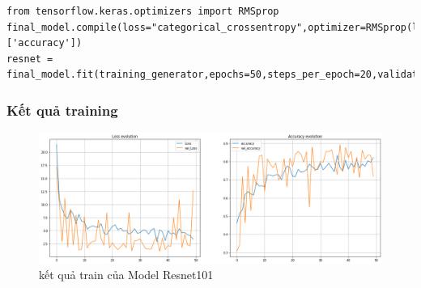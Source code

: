 \begin{lstlisting}
from tensorflow.keras.optimizers import RMSprop
final_model.compile(loss="categorical_crossentropy",optimizer=RMSprop(lr=0.001),metrics=['accuracy'])
resnet = final_model.fit(training_generator,epochs=50,steps_per_epoch=20,validation_data=validation_generator)
\end{lstlisting}

\subsubsection{Kết quả training}
\begin{center}
    \begin{figure}[!h]
        \centering
        \includegraphics[scale = 0.38]{fileanh/Resnet.png}
        \caption{kết quả train của Model Resnet101}
    \end{figure}
\end{center}

